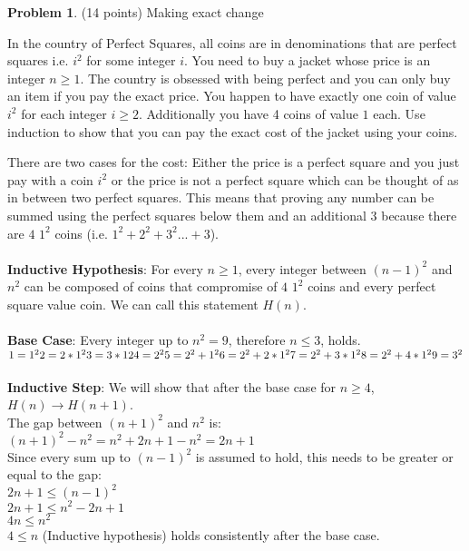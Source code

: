 \documentclass[11pt]{article}
\theoremstyle{definition}
\theoremstyle{theorem}
\newtheorem{prob}{Problem}
\newcommand{\solution}[1]{\medskip\noindent{\color{DarkBlue}\textbf{Solution:}} #1}
\newcommand{\solution}[1]{}
\begin{document}
\newpage

\begin{prob}
  (14 points) Making exact change
\end{prob}

In the country of Perfect Squares, all coins are in denominations that are
perfect squares i.e. $i^2$ for some integer $i$. You need to buy a jacket whose price is an integer $n\ge 1$.
The country is obsessed with being perfect and you can only buy an item if you pay the exact price.
You happen to have exactly one coin of value $i^2$ for each integer $i\ge 2$. 
Additionally you have 4 coins of value $1$ each. Use induction to show that you can pay the exact cost of
the jacket using your coins.

\solution{
There are two cases for the cost: Either the price is a perfect square and you just pay with a coin $i^2$ or the price is not a perfect square which can be thought of as in between two perfect squares. This means that proving any number can be summed using the perfect squares below them and an additional $3$ because there are $4$ $1^{2}$ coins (i.e. $1^{2} + 2^{2} + 3^{2}... + 3$). \\\\
\textbf{Inductive Hypothesis}: For every $n \ge 1$, every integer between $(n - 1)^{2}$ and $n^{2}$ can be composed of coins that compromise of $4$ $1^{2}$ coins and every perfect square value coin. We can call this statement $H(n)$. \\\\
\textbf{Base Case}: Every integer up to $n^{2} = 9$, therefore $n \le 3$, holds. \\
$1 = 1^{2} \\ 2 = 2 * 1^{2} \\ 3 = 3 * 1{2} \\ 4 = 2^{2} \\ 5 = 2^{2} + 1^{2} \\ 6 = 2^{2} + 2 * 1^{2} \\ 7 = 2^{2} + 3 * 1^{2} \\ 8 = 2^{2} + 4 * 1^{2} \\ 9 = 3^{2}$ \\\\
\textbf{Inductive Step}: We will show that after the base case for $n \ge 4$, $H(n) \rightarrow H(n + 1)$. \\
The gap between $(n + 1)^{2}$ and $n^{2}$ is: \\
$(n + 1)^{2} - n^{2} = n^{2} + 2n + 1 - n^{2} = 2n + 1$ \\
Since every sum up to $(n - 1)^{2}$ is assumed to hold, this needs to be greater or equal to the gap: \\
$2n + 1 \le (n - 1)^{2}$ \\
$2n + 1 \le n^{2} - 2n + 1$ \\
$4n \le n^{2}$ \\
$4 \le n$ (Inductive hypothesis) holds consistently after the base case.
}
\end{document}
